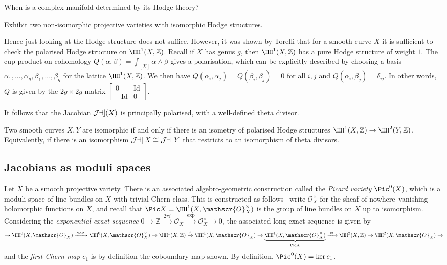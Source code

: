 When is a complex manifold determined by its Hodge theory?

\begin{exercise}
    Exhibit two non-isomorphic projective varieties with isomorphic Hodge
    structures.
\end{exercise}

Hence just looking at the Hodge structure does not suffice. However, it was
shown by Torelli that for a smooth curve \(X\) it is sufficient to check the
polarised Hodge structure on \(\HH^1(X,\mathbb{Z})\). Recall if \(X\) has genus
\(g\), then \(\HH^1(X,\mathbb{Z})\) has a pure Hodge structure of weight \(1\).
The cup product on cohomology \(Q(\alpha,\beta)=\int_{[X]}\alpha \wedge \beta\)
gives a polarisation, which can be explicitly described by choosing a basis
\(\alpha_1,...,\alpha_g,\beta_1,...,\beta_g\) for the lattice
\(\HH^1(X,\mathbb{Z})\). We then have
\(Q(\alpha_i,\alpha_j)=Q(\beta_i,\beta_j)=0\) for all \(i, j\) and
\(Q(\alpha_i,\beta_j)=\delta_{ij}\). In other words, \(Q\) is given by the
\(2g\times 2g\) matrix \(\left[\begin{smallmatrix} 0 & \text{Id} \\
-\text{Id} & 0 \end{smallmatrix}\right]\).

It follows that the Jacobian \(\mathop{\mathcal{J\kern -0.5pt a\kern -0.5pt c\kern -1pt}}(X)\) is principally polarised, with a
well-defined theta divisor.

\begin{theorem}[(Torelli)]
    Two smooth curves \(X,Y\) are isomorphic if and only if there is an isometry
    of polarised Hodge structures \(\HH^1(X,\mathbb{Z})\to
    \HH^2(Y,\mathbb{Z})\). Equivalently, if there is an isomorphism \(\mathop{\mathcal{J\kern -0.5pt a\kern -0.5pt c\kern -1pt}} X
    \cong \mathop{\mathcal{J\kern -0.5pt a\kern -0.5pt c\kern -1pt}} Y\) that restricts to an isomorphism of theta divisors.
\end{theorem}

\subsection{Jacobians as moduli spaces} Let \(X\) be a smooth projective
variety. There is an associated algebro-geometric construction called the
\textit{Picard variety} \(\Pic^0(X)\), which is a moduli space of line bundles
on \(X\) with trivial Chern class. This is constructed as follows-- write
\(\mathscr{O}_X^\times\) for the sheaf of nowhere--vanishing holomorphic
functions on \(X\), and recall that \(\Pic X = \HH^1(X,\mathscr{O}_X^\times)\)
is the group of line bundles on \(X\) up to isomorphism. Considering the
\textit{exponential exact sequence} \(0\to \mathbb{Z}\xrightarrow{\;2\pi
i\;}\mathscr{O}_X\xrightarrow{\;\exp\;} \mathscr{O}_X^\times \to 0\), the
associated long exact sequence is given by
\[\to
\HH^0(X,\mathscr{O}_X)\xrightarrow{\;\exp\;}\HH^0(X,\mathscr{O}_X^\times)
\to \HH^1(X,\mathbb{Z})\xrightarrow{j} \HH^1(X,\mathscr{O}_X)\to
\underbrace{\HH^1(X,\mathscr{O}_X^\times)}_{\text{Pic}X}\xrightarrow{\;c_1\;}
\HH^2(X,\mathbb{Z})\to \HH^2(X,\mathscr{O}_X)\to\]
and the \textit{first Chern map} \(c_1\) is by definition the coboundary
map shown. By definition, \(\Pic^0(X)=\ker c_1\).


